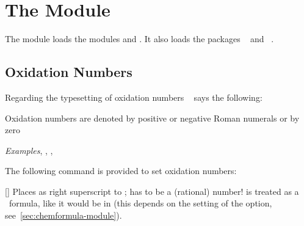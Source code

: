 \documentclass{chemmacros-manual}
\begin{document}
\begin{example}
   \par
\end{example}

\begin{example}
  
\end{example}

\section{The  Module}\label{sec:redox-module}

The  module loads the modules  and
. It also loads the packages
~\cite{pkg:mathtools} and ~\cite{pkg:relsize}.

\subsection{Oxidation Numbers}\label{sec:oxidation-numbers}

Regarding the typesetting of oxidation numbers
~\cite{iupac:greenbook} says the following:
\begin{cnltxquote}
  Oxidation numbers are denoted by positive or negative Roman numerals or by
  zero \textelp{}

  \textit{Examples}\quad {}, , ,
\end{cnltxquote}

The following command is provided to set oxidation numbers:
\begin{commands}
  [\sarg{}]
    Places  as right superscript to ; 
    has to be a (rational) number!   is treated as a \chemformula\
    formula, like it would be in  (this depends on the setting of
    the \option{formula} option, see~\vref{sec:chemformula-module}).
\end{commands}
\end{document}
